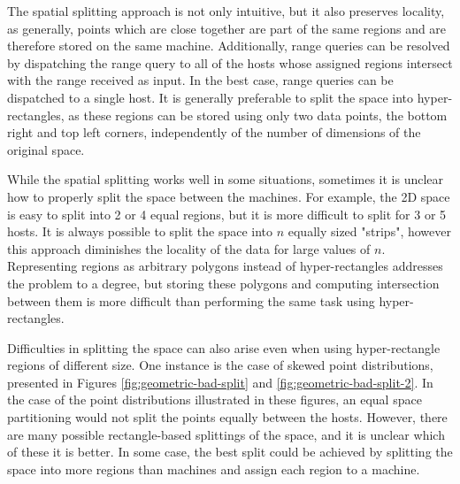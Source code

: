 \documentclass[11pt,a4paper]{globis-book}
\begin{document}
The spatial splitting approach is not only intuitive, but it also preserves locality, as generally, points which are close together are part of the same regions and are therefore stored on the same machine. Additionally, range queries can be resolved by dispatching the range query to all of the hosts whose assigned regions intersect with the range received as input. In the best case, range queries can be dispatched to a single host. It is generally preferable to split the space into hyper-rectangles, as these regions can be stored using only two data points, the bottom right and top left corners, independently of the number of dimensions of the original space. 

While the spatial splitting works well in some situations, sometimes it is unclear how to properly split the space between the machines. For example, the 2D space is easy to split into 2 or 4 equal regions, but it is more difficult to split for 3 or 5 hosts. It is always possible to split the space into $n$ equally sized "strips", however this approach diminishes the locality of the data for large values of $n$. Representing regions as arbitrary polygons instead of hyper-rectangles addresses the problem to a degree, but storing these polygons and computing intersection between them is more difficult than performing the same task using hyper-rectangles. 

Difficulties in splitting the space can also arise even when using hyper-rectangle regions of different size. One instance is the case of skewed point distributions, presented in Figures \ref{fig:geometric-bad-split} and \ref{fig:geometric-bad-split-2}. In the case of the point distributions illustrated in these figures, an equal space partitioning would not split the points equally between the hosts. However, there are many possible rectangle-based splittings of the space, and it is unclear which of these it is better. In some case, the best split could be achieved by splitting the space into more regions than machines and assign each region to a machine.
\end{document}
